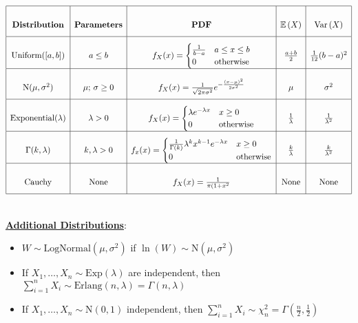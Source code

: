 \documentclass[12pt]{extarticle}
\newcommand{\pstart}[0]{\noindent}
\newcommand{\newp}[0]{~\\\pstart}
\newcommand{\titleul}[1]{\pstart\textbf{\ul{#1}}}
\theoremstyle{definition}
\theoremstyle{remark}
\newcommand{\expected}[1]{\mathbb{E}\left(#1\right)}
\newcommand{\variance}[1]{\text{Var}\left(#1\right)}
\newcommand{\normal}[2]{\text{N}(#1,#2)}
\newcommand{\uniform}[1]{\text{Uniform}(#1)}
\begin{document}
\[\def\arraystretch{3}
\begin{array}{|c|c|c|c|c|}
    \hline \textbf{Distribution} & \textbf{Parameters} & \textbf{PDF} & 
\expected{X} & \variance{X} \\ \hline

    \uniform{[a,b]} & a\leq b & f_X(x)=\begin{cases}
        \frac{1}{b-a} & a\leq x\leq b \\
        0 & \text{otherwise}
    \end{cases} & \frac{a+b}{2} & \frac{1}{12}(b-a)^2 \\ \hline

    \normal{\mu}{\sigma^2} & \mu;\,\sigma\geq0 & 
f_X(x)=\frac{1}{\sqrt{2\pi\sigma^2}}e^{-\frac{(x-\mu)^2}{2\sigma^2}} & \mu 
& \sigma^2 \\ \hline

    \text{Exponential}(\lambda) & \lambda>0 & f_X(x)=\begin{cases}
        \lambda e^{-\lambda x} & x\geq 0 \\
        0 & \text{otherwise}
    \end{cases} & \frac{1}{\lambda} & \frac{1}{\lambda^2} \\ \hline

    \Gamma(k,\lambda) & k,\lambda>0 &
    f_x(x)=\begin{cases}
        \frac{1}{\Gamma(k)}\lambda^kx^{k-1}e^{-\lambda x} & x\geq 0 \\ 0 & 
\text{otherwise}
    \end{cases} & 
    \frac{k}{\lambda} & \frac{k}{\lambda^2} \\ \hline

    \text{Cauchy} & \text{None} & 
    f_X(x)=\frac{1}{\pi(1+x^2} & \text{None} & \text{None} \\ \hline

\end{array}\]

\newp
\titleul{Additional Distributions}: 
\begin{itemize}
    \item $W\sim\text{LogNormal}(\mu,\sigma^2)$ if 
$\ln(W)\sim\normal{\mu}{\sigma^2}$
    \item If $X_1,\hdots,X_n\sim\text{Exp}(\lambda)$ are independent, then 
$\sum_{i=1}^nX_i\sim\text{Erlang}(n,\lambda)=\Gamma(n,\lambda)$
    \item If $X_1,\hdots,X_n\sim\normal{0}{1}$ independent, then 
$\sum_{i=1}^n X_i\sim\chi_n^2=\Gamma(\frac{n}{2},\frac{1}{2})$
\end{itemize}
\end{document}
